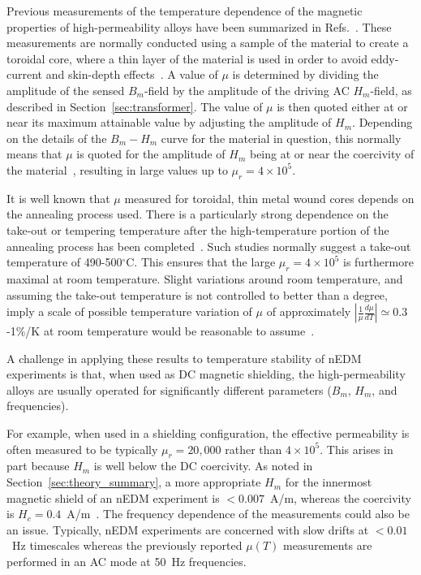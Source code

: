 \documentclass[review]{elsarticle}
\begin{document}
Previous measurements of the temperature dependence of the magnetic
properties of high-permeability alloys have been summarized in
Refs.~\cite{bib:pfeifer,bib:bozorth,bib:couderchon}.  These
measurements are normally conducted using a sample of the material to
create a toroidal core, where a thin layer of the material is used in
order to avoid eddy-current and skin-depth
effects~\cite{bib:pfeifer,bib:kruppvdm}.  A value of $\mu$ is
determined by dividing the amplitude of the sensed $B_m$-field by the
amplitude of the driving AC $H_m$-field, as described in
Section~\ref{sec:transformer}.  The value of $\mu$ is then quoted
either at or near its maximum attainable value by adjusting the
amplitude of $H_m$.  Depending on the details of the $B_m-H_m$ curve
for the material in question, this normally means that $\mu$ is quoted
for the amplitude of $H_m$ being at or near the coercivity of the
material~\cite{bib:couderchon,bib:kruppvdm}, resulting in large values
up to $\mu_r=4\times 10^5$.

It is well known that $\mu$ measured for toroidal, thin metal wound
cores depends on the annealing process used.  There is a particularly
strong dependence on the take-out or tempering temperature after the
high-temperature portion of the annealing process has been
completed~\cite{bib:pfeifer,bib:kruppvdm,bib:couderchon}.  Such
studies normally suggest a take-out temperature of 490-500$^\circ$C.
This ensures that the large $\mu_r=4\times 10^{5}$ is furthermore
maximal at room temperature.  Slight variations around room
temperature, and assuming the take-out temperature is not controlled
to better than a degree, imply a scale of possible temperature
variation of $\mu$ of approximately
$\left|\frac{1}{\mu}\frac{d\mu}{dT}\right|\simeq 0.3$-1\%/K at room temperature
would be reasonable to assume~\cite{bib:couderchon,bib:kruppvdm}.

A challenge in applying these results to temperature stability of nEDM
experiments is that, when used as DC magnetic shielding, the
high-permeability alloys are usually operated for significantly
different parameters ($B_m$, $H_m$, and frequencies).

For example, when used in a shielding configuration, the effective
permeability is often measured to be typically $\mu_r=20,000$ rather
than $4\times 10^5$.  This arises in part because $H_m$ is well below
the DC coercivity.  As noted in Section~\ref{sec:theory_summary}, a
more appropriate $H_m$ for the innermost magnetic shield of an nEDM
experiment is $<0.007$~A/m, whereas the coercivity is
$H_c=0.4$~A/m~\cite{bib:kruppvdm}.  The frequency dependence of the
measurements could also be an issue.  Typically, nEDM experiments are
concerned with slow drifts at $<0.01$~Hz timescales whereas the
previously reported $\mu(T)$ measurements are performed in an AC mode
at 50~Hz frequencies.
\end{document}
